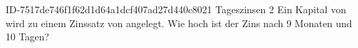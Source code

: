 \begin{exercise}
      {ID-7517de746f1f62d1d64a1dcf407ad27d440c8021}
      {Tageszinsen 2}
  \ifproblem\problem
    Ein Kapital von  wird zu einem Zinssatz von  angelegt.
    Wie hoch ist der Zins nach \num{9} Monaten und \num{10} Tagen?
  \fi
\end{exercise}
